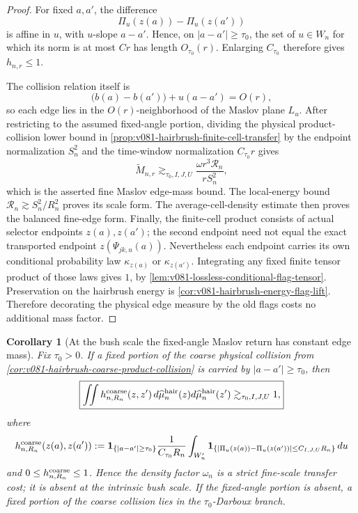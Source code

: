 \documentclass[10pt]{article}
\newtheorem{corollary}[theorem]{Corollary}
\begin{document}
\begin{proof}
For fixed \(a,a'\), the difference
\[
\Pi_u(z(a))-\Pi_u(z(a'))
\]
is affine in \(u\), with \(u\)-slope \(a-a'\).  Hence, on
\(|a-a'|\ge\tau_0\), the set of \(u\in W_n\) for which its norm is at most
\(Cr\) has length \(O_{\tau_0}(r)\).  Enlarging \(C_{\tau_0}\) therefore gives
\(h_{n,r}\le1\).

The collision relation itself is
\[
\bigl(b(a)-b(a')\bigr)+u(a-a')=O(r),
\]
so each edge lies in the \(O(r)\)-neighborhood of the Maslov plane \(L_u\).
After restricting to the assumed fixed-angle portion, dividing the physical product-collision
lower bound in \cref{prop:v081-hairbrush-finite-cell-transfer} by the endpoint normalization
\(S_n^2\) and the time-window normalization \(C_{\tau_0}r\) gives
\[
\widetilde M_{n,r}
\gtrsim_{\tau_0,I,J,U}
\frac{\omega r^3\mathcal R_n}{rS_n^2},
\]
which is the asserted fine Maslov edge-mass bound.  The local-energy bound
\(\mathcal R_n\gtrsim S_n^2/R_n^2\) proves its scale form.  The average-cell-density estimate then
proves the balanced fine-edge form.
Finally, the finite-cell product consists of actual selector endpoints
\(z(a),z(a')\); the second endpoint need not equal the exact transported endpoint
\(z(\Psi_{jk,u}(a))\).  Nevertheless each endpoint carries its own conditional probability law
\(\kappa_{z(a)}\) or \(\kappa_{z(a')}\).  Integrating any fixed finite tensor product of those laws
gives \(1\), by \cref{lem:v081-lossless-conditional-flag-tensor}.  Preservation on the hairbrush
energy is \cref{cor:v081-hairbrush-energy-flag-lift}.
Therefore decorating the physical edge measure by the old flags costs no additional mass factor.
\end{proof}

\begin{corollary}[At the bush scale the fixed-angle Maslov return has constant edge mass]
\label{cor:v081-hairbrush-coarse-maslov-graph}
Fix \(\tau_0>0\).  If a fixed portion of the coarse physical collision from
\cref{cor:v081-hairbrush-coarse-product-collision} is carried by
\(|a-a'|\ge\tau_0\), then
\begin{equation}
\label{eq:v081-hairbrush-coarse-maslov-edge}
\boxed{
\iint h^{\rm coarse}_{n,R_n}(z,z')\,
d\widehat\mu_n^{\rm hair}(z)d\widehat\mu_n^{\rm hair}(z')
\gtrsim_{\tau_0,I,J,U}1,
}
\end{equation}
where
\[
h^{\rm coarse}_{n,R_n}(z(a),z(a'))
:=
\mathbf 1_{\{|a-a'|\ge\tau_0\}}
\frac1{C_{\tau_0}R_n}
\int_{W_n'}
\mathbf 1_{\{|\Pi_u(z(a))-\Pi_u(z(a'))|\le C_{I,J,U}R_n\}}\,du
\]
and \(0\le h^{\rm coarse}_{n,R_n}\le1\).  Hence the density factor
\(\omega_n\) is a strict fine-scale transfer cost; it is absent at the intrinsic bush scale.
If the fixed-angle portion is absent, a fixed portion of the coarse collision lies in the
\(\tau_0\)-Darboux branch.
\end{corollary}
\end{document}
